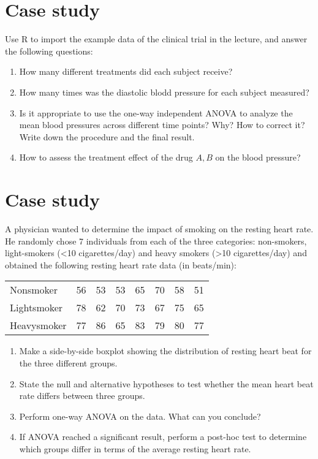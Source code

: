 \documentclass[a4paper,11pt]{article}
\begin{document}
\begin{CJK*}{UTF8}{gbsn}
\section{Case study}
Use R to import the example data of the clinical trial in the lecture, and answer the 
following questions:  
\begin{enumerate}[(1)]
	\item How many different treatments did each subject receive?
	\item How many times was the diastolic blodd pressure for each subject measured?
	\item Is it appropriate to use the one-way independent ANOVA to analyze the mean 
		blood pressures across different time points? Why? How to correct it? 
		Write down the procedure and the final result. 
	\item How to assess the treatment effect of the drug $A, B$ on the blood pressure?
\end{enumerate}



\section{Case study}
A physician wanted to determine the impact of smoking on the resting 
heart rate. He randomly chose 7 individuals from each of the three 
categories: non-smokers, light-smokers (<10 cigarettes/day) and heavy 
smokers (>10 cigarettes/day) and obtained the following resting heart 
rate data (in beats/min):
\begin{table}
\begin{tabular}{lccccccc}
Nonsmoker & 56 & 53 & 53 & 65 & 70 & 58 & 51\\
Lightsmoker & 78 & 62 & 70 & 73 & 67 & 75 & 65\\
Heavysmoker & 77 & 86 & 65 & 83 & 79 & 80 & 77
\end{tabular}
\end{table}

\begin{enumerate}[(1)]
	\item Make a side-by-side boxplot showing the distribution of resting 
		heart beat for the three different groups.
	\item State the null and alternative hypotheses to test whether the mean 
		heart beat rate differs between three groups.
	\item Perform one-way ANOVA on the data. What can you conclude?
	\item If ANOVA reached a significant result, perform a post-hoc test to 
		determine which groups differ in terms of the average resting 
		heart rate. 
\end{enumerate}

\end{CJK*}
\end{document}
